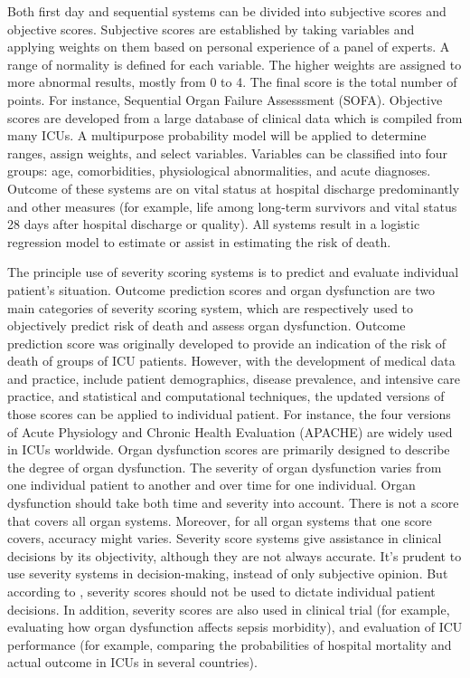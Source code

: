 \documentclass[12pt,a4paper,english
]{tunithesis}
\begin{document}
Both first day and sequential systems can be divided into subjective scores and objective scores. Subjective scores are established by taking variables and applying weights on them based on personal experience of a panel of experts. A range of normality is defined for each variable. The higher weights are assigned to more abnormal results, mostly from 0 to 4. The final score is the total number of points. For instance, Sequential Organ Failure Assesssment (SOFA). Objective scores are developed from a large database of clinical data which is compiled from many ICUs. A multipurpose probability model will be applied to determine ranges, assign weights, and select variables. Variables can be classified into four groups: age, comorbidities, physiological abnormalities, and acute diagnoses. Outcome of these systems are on vital status at hospital discharge predominantly and other measures (for example, life among long-term survivors and vital status 28 days after hospital discharge or quality). All systems result in a logistic regression model to estimate or assist in estimating the risk of death. \parencite{LeGall2005, Bouch2008} 

The principle use of severity scoring systems is to predict and evaluate individual patient's situation. Outcome prediction scores and organ dysfunction are two main categories of severity scoring system, which are respectively used to objectively predict risk of death and assess organ dysfunction. Outcome prediction score was originally developed to provide an indication of the risk of death of groups of ICU patients. However, with the development of medical data and practice, include patient demographics, disease prevalence, and intensive care practice, and statistical and computational techniques, the updated versions of those scores can be applied to individual patient. For instance, the four versions of Acute Physiology and Chronic Health Evaluation (APACHE)  are widely used in ICUs worldwide. Organ dysfunction scores are primarily designed to describe the degree of organ dysfunction. The severity of organ dysfunction varies from one individual patient to another and over time for one individual. Organ dysfunction should take both time and severity into account. There is not a score that covers all organ systems. Moreover, for all organ systems that one score covers, accuracy might varies. \parencite{LeGall2005, Bouch2008, Vincent2010} Severity score systems give assistance in clinical decisions by its objectivity, although they are not always accurate. It's prudent to use severity systems in decision-making, instead of only subjective opinion. But according to \textcite{LeGall2005, Vincent2010-at}, severity scores should not be used to dictate individual patient decisions. In addition, severity scores are also used in clinical trial (for example, evaluating how organ dysfunction affects sepsis morbidity), and evaluation of ICU performance (for example, comparing the probabilities of hospital mortality and actual outcome in ICUs in several countries). \parencite{LeGall2005, Vincent2010}
\end{document}
